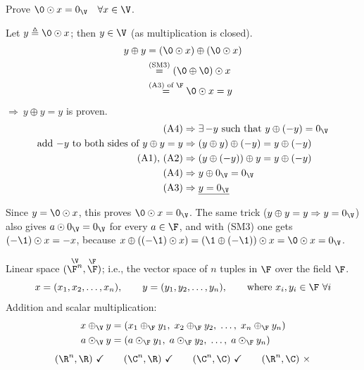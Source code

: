 \begin{example}
Prove $\0\odot x = 0_{\V} \quad \forall x\in\V$.

Let $y \triangleq \0\odot x$; then $y\in\V$ (as multiplication is closed).
\begin{align*}
y\oplus y &= (\0\odot x)\oplus(\0\odot x)\\
&\overset{\text{(SM3)}}{=} (\0\oplus\0)\odot x\\
&\overset{\text{(A3) of }\F}{=} \0\odot x = y
\end{align*}
$\Rightarrow\ y\oplus y = y$ is proven.
\begin{align*}
\text{(A4)} &\Rightarrow \exists\, {-y} \text{ such that } y\oplus(-y) = 0_{\V}\\
\text{add $-y$ to both sides of } y\oplus y=y &\Rightarrow (y\oplus y)\oplus(-y) = y\oplus(-y)\\
\text{(A1), (A2)} &\Rightarrow (y\oplus(-y))\oplus y = y\oplus(-y)\\
\text{(A4)} &\Rightarrow y\oplus 0_{\V} = 0_{\V}\\
\text{(A3)} &\Rightarrow \underline{y = 0_{\V}}
\end{align*}
\begin{insight}
Since $y=\0\odot x$, this proves $\0\odot x=0_{\V}$. The same trick ($y\oplus y=y\Rightarrow y=0_{\V}$) also gives $a\odot 0_{\V}=0_{\V}$ for every $a\in\F$, and with (SM3) one gets $(-\1)\odot x = -x$, because $x\oplus((-\1)\odot x) = (\1\oplus(-\1))\odot x = \0\odot x = 0_{\V}$.
\end{insight}
\end{example}

\begin{example}
Linear space $(\overset{\V}{\F^n},\overset{\F}{\F})$; i.e., the vector space of $n$ tuples in $\F$ over the field $\F$.
\[
x = (x_1,x_2,\dots,x_n), \qquad y = (y_1,y_2,\dots,y_n), \qquad \text{where } x_i,y_i\in\F\ \forall i
\]
Addition and scalar multiplication:
\begin{align*}
x\oplus_{\V} y &= (x_1\oplus_{\F} y_1,\; x_2\oplus_{\F} y_2,\;\dots,\; x_n\oplus_{\F} y_n)\\
a\odot_{\V} y &= (a\odot_{\F} y_1,\; a\odot_{\F} y_2,\;\dots,\; a\odot_{\F} y_n)
\end{align*}
\[
(\R^n,\R)\ \checkmark \qquad (\C^n,\R)\ \checkmark \qquad (\C^n,\C)\ \checkmark \qquad (\R^n,\C)\ \times
\]
\end{example}

